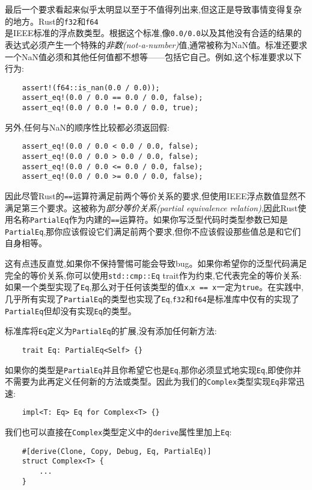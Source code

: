 最后一个要求看起来似乎太明显以至于不值得列出来,但这正是导致事情变得复杂的地方。Rust的\texttt{f32}和\texttt{f64}\\
是IEEE标准的浮点数类型。根据这个标准,像\texttt{0.0/0.0}以及其他没有合适的结果的表达式必须产生一个特殊的\emph{非数(not-a-number)}值,通常被称为NaN值。标准还要求一个NaN值必须和其他任何值都不想等——包括它自己。例如,这个标准要求以下行为:
\begin{verbatim}
    assert!(f64::is_nan(0.0 / 0.0));
    assert_eq!(0.0 / 0.0 == 0.0 / 0.0, false);
    assert_eq!(0.0 / 0.0 != 0.0 / 0.0, true);
\end{verbatim}

另外,任何与NaN的顺序性比较都必须返回假:
\begin{verbatim}
    assert_eq!(0.0 / 0.0 < 0.0 / 0.0, false);
    assert_eq!(0.0 / 0.0 > 0.0 / 0.0, false);
    assert_eq!(0.0 / 0.0 <= 0.0 / 0.0, false);
    assert_eq!(0.0 / 0.0 >= 0.0 / 0.0, false);
\end{verbatim}

因此尽管Rust的\texttt{==}运算符满足前两个等价关系的要求,但使用IEEE浮点数值显然不满足第三个要求。这被称为\emph{部分等价关系(partial equivalence relation)},因此Rust使用名称\texttt{PartialEq}作为内建的\texttt{==}运算符。如果你写泛型代码时类型参数已知是\texttt{PartialEq},那你应该假设它们满足前两个要求,但你不应该假设那些值总是和它们自身相等。

这有点违反直觉,如果你不保持警惕可能会导致bug。如果你希望你的泛型代码满足完全的等价关系,你可以使用\texttt{std::cmp::Eq} trait作为约束,它代表完全的等价关系:如果一个类型实现了\texttt{Eq},那么对于任何该类型的值\texttt{x},\texttt{x == x}一定为\texttt{true}。在实践中,几乎所有实现了\texttt{PartialEq}的类型也实现了\texttt{Eq},\texttt{f32}和\texttt{f64}是标准库中仅有的实现了\texttt{PartialEq}但却没有实现\texttt{Eq}的类型。

标准库将\texttt{Eq}定义为\texttt{PartialEq}的扩展,没有添加任何新方法:
\begin{verbatim}
    trait Eq: PartialEq<Self> {}
\end{verbatim}

如果你的类型是\texttt{PartialEq}并且你希望它也是\texttt{Eq},那你必须显式地实现\texttt{Eq},即使你并不需要为此再定义任何新的方法或类型。因此为我们的\texttt{Complex}类型实现\texttt{Eq}非常迅速:
\begin{verbatim}
    impl<T: Eq> Eq for Complex<T> {}
\end{verbatim}

我们也可以直接在\texttt{Complex}类型定义中的\texttt{derive}属性里加上\texttt{Eq}:
\begin{verbatim}
    #[derive(Clone, Copy, Debug, Eq, PartialEq)]
    struct Complex<T> {
        ...
    }
\end{verbatim}


